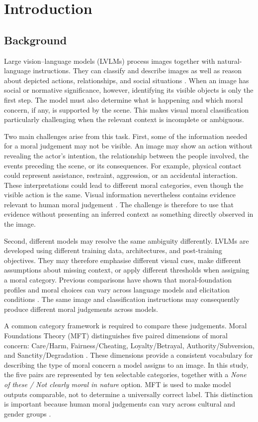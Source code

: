 \chapter{Introduction}
\label{Chap1}

\section{Background}

Large vision--language models (LVLMs) process images together with
natural-language instructions. They can classify and describe images as well
as reason about depicted actions, relationships, and social situations
\cite{zellers2019recognition}. When an image has social or normative
significance, however, identifying its visible objects is only the first step.
The model must also determine what is happening and which moral concern, if
any, is supported by the scene. This makes visual moral classification
particularly challenging when the relevant context is incomplete or
ambiguous.

Two main challenges arise from this task. First, some of the information needed
for a moral judgement may not be visible. An image may show an action without
revealing the actor's intention, the relationship between the people involved,
the events preceding the scene, or its consequences. For example, physical
contact could represent assistance, restraint, aggression, or an accidental
interaction. These interpretations could lead to different moral categories,
even though the visible action is the same. Visual information nevertheless
contains evidence relevant to human moral judgement
\cite{zhu2025visual}. The challenge is therefore to use that evidence without
presenting an inferred context as something directly observed in the image.

Second, different models may resolve the same ambiguity differently. LVLMs are
developed using different training data, architectures, and post-training
objectives. They may therefore emphasise different visual cues, make different
assumptions about missing context, or apply different thresholds when assigning
a moral category. Previous comparisons have shown that moral-foundation
profiles and moral choices can vary across language models and elicitation
conditions \cite{abdulhai2024foundations,liu2024pluralistic}. The same image
and classification instructions may consequently produce different moral
judgements across models.

A common category framework is required to compare these judgements. Moral
Foundations Theory (MFT) distinguishes five paired dimensions of moral concern:
Care/Harm, Fairness/Cheating, Loyalty/Betrayal, Authority/Subversion, and
Sanctity/Degradation
\cite{graham2009liberals,graham2011mapping}. These dimensions provide a
consistent vocabulary for describing the type of moral concern a model assigns
to an image. In this study, the five pairs are represented by ten selectable
categories, together with a \textit{None of these / Not clearly moral in
nature} option. MFT is used to make model outputs comparable, not to determine
a universally correct label. This distinction is important because human
moral judgements can vary across cultural and gender groups
\cite{qian2024cultural}.

